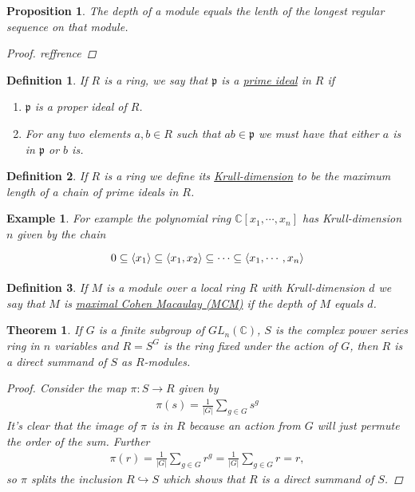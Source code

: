 \documentclass[11pt, a4paper, english]{article}
\newtheorem{prop}{Proposition}
\numberwithin{prop}{section}
\numberwithin{lemma}{section}
\newtheorem{theorem}{Theorem}
\numberwithin{theorem}{section}
\newtheorem{defin}{Definition}
\numberwithin{defin}{section}
\newtheorem{example}{Example}
\numberwithin{example}{section}
\newcommand{\C}{\mathbb{C}}
\begin{document}
\begin{prop}
The depth of a module equals the lenth of the longest regular sequence on that module.
\begin{proof}
{\color{red} reffrence}
\end{proof}
\end{prop}

\begin{defin}
If $R$ is a ring, we say that $\mathfrak{p}$ is  a \underline{prime ideal} in $R$ if
\begin{enumerate}
\item $\mathfrak{p}$ is a proper ideal of $R$.
\item For any two elements $a,b \in R$ such that $ab \in \mathfrak{p}$ we must have that either $a$ is in $\mathfrak{p}$ or $b$ is.
\end{enumerate}
\end{defin}
\fi

\begin{defin}
If $R$ is a ring we define its \underline{Krull-dimension} to be the maximum length of a chain of prime ideals in $R$. 
\end{defin}
\begin{example}
For example the polynomial ring $\C[x_1, \cdots, x_n]$ has Krull-dimension $n$ given by the chain
\begin{equation*}
\begin{tikzcd}
0 \subseteq \langle x_1 \rangle \subseteq \langle x_1, x_2 \rangle \subseteq \cdots \subseteq \langle x_1, \cdots, x_n \rangle
\end{tikzcd}
\end{equation*}
\end{example}

\begin{defin}
If $M$ is a module over a local ring $R$ with Krull-dimension $d$ we say that $M$ is \underline{maximal Cohen Macaulay (MCM)} if the depth of $M$ equals $d$.
\end{defin}

\begin{theorem}
If $G$ is a finite subgroup of $GL_n(\C)$, $S$ is the complex power series ring in $n$ variables and $R = S^G$ is the ring fixed under the action of $G$, then $R$ is a direct summand of $S$ as $R$-modules.

\begin{proof}
Consider the map $\pi: S \to R$ given by
\begin{align*}
\pi(s) = \frac{1}{|G|} \sum_{g\in G} s^g
\end{align*}
It's clear that the image of $\pi$ is in $R$ because an action from $G$ will just permute the order of the sum. Further \begin{align*}
\pi(r) = \frac{1}{|G|} \sum_{g\in G} r^g = \frac{1}{|G|} \sum_{g\in G} r = r,
\end{align*}
so $\pi$ splits the inclusion $R \hookrightarrow S$ which shows that $R$ is a direct summand of $S$.
\end{proof}
\end{theorem}
\end{document}
